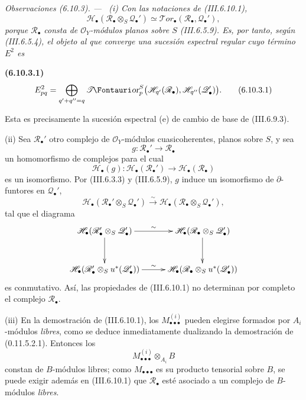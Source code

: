 \documentclass[10pt,oneside]{book}
\makeatletter
\newcommand{\sh}[1]{\mathscr{#1}}
\newcommand*{\ega@sheafop}[3]{\sh{#1}#2\textup{\kern-2.2pt{\Fontauri\slshape #3}}}
\newcommand{\shTor}{\ega@sheafop{T}{}{or}}
\newcommand{\sref}[2][]{\textup{(#2)}}
\newcommand{\oldpage}[2][]{\setcounter{footnote}{0}\marginpar{\scriptsize\textbf{#1}~|~#2}\ignorespaces}
\newenvironment{env}[1][]{\par\medskip\noindent\textbf{(#1)}\ }{\par}
\newenvironment{remarks}[1][]{\par\medskip\noindent\itshape Observaciones (#1). ---\ }{\par}
\makeatother
\begin{document}
\begin{remarks}[6.10.3]
\label{III.6.10.3}
\textnormal{(i)}
Con las notaciones de \sref{III.6.10.1},
\[
  \sh H_\bullet
  (\sh R_\bullet\otimes_S\sh Q_\bullet')
  \simeq
  \mathscr T\!or_\bullet(\sh R_\bullet,\sh Q_\bullet'),
\]
porque $\sh R_\bullet$ consta de $\sh O_Y$-módulos planos sobre
$S$ \sref{III.6.5.9}. Es, por tanto, según \sref{III.6.5.4}, el
objeto al que converge una sucesión espectral regular cuyo término
$E^2$ es
\begin{env}[6.10.3.1]
\label{III.6.10.3.1}
\[
  E^2_{pq}
  =
  \bigoplus_{q'+q''=q}
  \shTor_p^S
  \bigl(
    \sh H_{q'}(\sh R_\bullet),
    \sh H_{q''}(\sh Q_\bullet')
  \bigr).
  \tag{6.10.3.1}\label{III.6.10.3.1.eq}
\]
\end{env}
Esta es precisamente la sucesión espectral (e) de cambio de base
de \sref{III.6.9.3}.

\medskip
\textnormal{(ii)}
Sea $\sh R_\bullet'$ otro complejo de $\sh O_Y$-módulos
cuasicoherentes, planos sobre $S$, y sea
\[
  g:\sh R_\bullet'\longrightarrow\sh R_\bullet
\]
un homomorfismo de complejos para el cual
\[
  \sh H_\bullet(g):
  \sh H_\bullet(\sh R_\bullet')
  \longrightarrow
  \sh H_\bullet(\sh R_\bullet)
\]
es un isomorfismo. Por \sref{III.6.3.3} y
\sref{III.6.5.9}, $g$ induce un isomorfismo de
$\partial$-funtores en $\sh Q_\bullet'$,
\[
  \sh H_\bullet
  (\sh R_\bullet'\otimes_S\sh Q_\bullet')
  \xrightarrow{\sim}
  \sh H_\bullet
  (\sh R_\bullet\otimes_S\sh Q_\bullet'),
\]
tal que el diagrama
\[
\xymatrix@C=28pt@R=30pt{
  \sh H_\bullet
  (\sh R_\bullet'\otimes_S\sh Q_\bullet')
  \ar[r]^-{\sim}\ar[d]
  &
  \sh H_\bullet
  (\sh R_\bullet\otimes_S\sh Q_\bullet')
  \ar[d]
  \\
  \sh H_\bullet
  (\sh R_\bullet'\otimes_Su^*(\sh Q_\bullet'))
  \ar[r]^-{\sim}
  &
  \sh H_\bullet
  (\sh R_\bullet\otimes_Su^*(\sh Q_\bullet'))
}
\]
es conmutativo. Así, las propiedades de \sref{III.6.10.1} no
determinan por completo el complejo $\sh R_\bullet$.

\medskip
\oldpage[III]{173}
\textnormal{(iii)}
En la demostración de \sref{III.6.10.1}, los
$M_{\bullet\bullet\bullet}^{(i)}$ pueden elegirse formados por
$A_i$-módulos \emph{libres}, como se deduce inmediatamente dualizando la
demostración de \sref[0]{0.11.5.2.1}. Entonces los
\[
  M_{\bullet\bullet\bullet}^{(i)}\otimes_{A_i}B
\]
constan de $B$-módulos libres; como
$M_{\bullet\bullet\bullet}$ es su producto tensorial sobre $B$,
se puede exigir además en \sref{III.6.10.1} que
$\sh R_\bullet$ esté asociado a un complejo de $B$-módulos
\emph{libres}.


\end{remarks}
\end{document}
